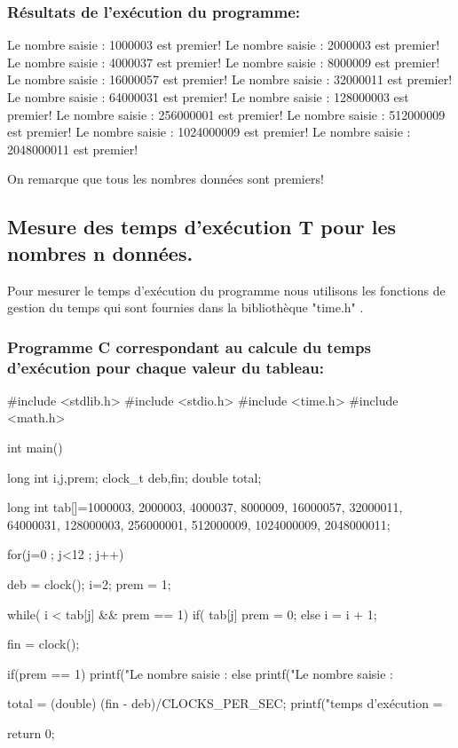 \documentclass[12pt]{article}
\begin{document}
\subsubsection{Résultats de l'exécution du programme:}
\begin{sql}
Le nombre saisie : 1000003 est premier!
Le nombre saisie : 2000003 est premier!
Le nombre saisie : 4000037 est premier!
Le nombre saisie : 8000009 est premier!
Le nombre saisie : 16000057 est premier!
Le nombre saisie : 32000011 est premier!
Le nombre saisie : 64000031 est premier!
Le nombre saisie : 128000003 est premier!
Le nombre saisie : 256000001 est premier!
Le nombre saisie : 512000009 est premier!
Le nombre saisie : 1024000009 est premier!
Le nombre saisie : 2048000011 est premier!
\end{sql}

On remarque que tous les nombres données sont premiers!

\subsection{Mesure des temps d'exécution T pour les nombres n données.}

Pour mesurer le temps d'exécution du programme nous utilisons les fonctions de gestion du temps qui sont fournies dans la bibliothèque "time.h" .

\subsubsection{Programme C correspondant au calcule du temps d'exécution pour chaque valeur du tableau:}
\begin{sql}
#include <stdlib.h>
#include <stdio.h>
#include <time.h>
#include <math.h>

int main()
{
	long int i,j,prem;
	clock_t deb,fin;
	double total;

	long int tab[]={1000003, 2000003, 4000037, 8000009, 16000057, 32000011,	64000031, 128000003, 256000001,	512000009,	1024000009, 2048000011};

for(j=0 ; j<12 ; j++)
{
	deb = clock();
	i=2;
	prem = 1;

	while( i < tab[j] && prem == 1){
		if( tab[j]%
			prem = 0;
		else
			i = i + 1;
	}

	fin = clock();

	if(prem == 1)
    {
        printf("Le nombre saisie : %
    }
	else{
        printf("Le nombre saisie : %
	}

	total = (double) (fin - deb)/CLOCKS_PER_SEC;
	printf("temps d'exécution = %
}
return 0;
}
\end{sql}
\end{document}
